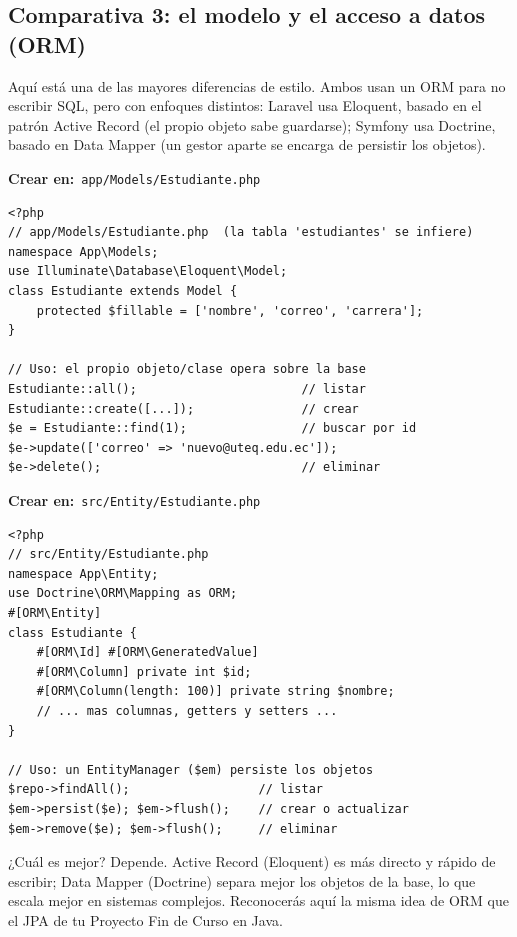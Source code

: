 \documentclass[11pt]{article}
\begin{document}
\subsection{Comparativa 3: el modelo y el acceso a datos (ORM)}
Aquí está una de las mayores diferencias de estilo. Ambos usan un ORM para no escribir SQL, pero con enfoques distintos: Laravel usa Eloquent, basado en el patrón Active Record (el propio objeto sabe guardarse); Symfony usa Doctrine, basado en Data Mapper (un gestor aparte se encarga de persistir los objetos).

{\small\color{phpazulo}\textbf{Crear en:}~}\texttt{app/\allowbreak{}Models/\allowbreak{}Estudiante.\allowbreak{}php}\par\nobreak\vspace{-1pt}
\begin{cajacodigo}
\begin{lstlisting}[style=php]
<?php
// app/Models/Estudiante.php  (la tabla 'estudiantes' se infiere)
namespace App\Models;
use Illuminate\Database\Eloquent\Model;
class Estudiante extends Model {
    protected $fillable = ['nombre', 'correo', 'carrera'];
}

// Uso: el propio objeto/clase opera sobre la base
Estudiante::all();                       // listar
Estudiante::create([...]);               // crear
$e = Estudiante::find(1);                // buscar por id
$e->update(['correo' => 'nuevo@uteq.edu.ec']);
$e->delete();                            // eliminar
\end{lstlisting}
\end{cajacodigo}
\vspace{2pt}
{\small\color{phpazulo}\textbf{Crear en:}~}\texttt{src/\allowbreak{}Entity/\allowbreak{}Estudiante.\allowbreak{}php}\par\nobreak\vspace{-1pt}
\begin{cajacodigo}
\begin{lstlisting}[style=php]
<?php
// src/Entity/Estudiante.php
namespace App\Entity;
use Doctrine\ORM\Mapping as ORM;
#[ORM\Entity]
class Estudiante {
    #[ORM\Id] #[ORM\GeneratedValue]
    #[ORM\Column] private int $id;
    #[ORM\Column(length: 100)] private string $nombre;
    // ... mas columnas, getters y setters ...
}

// Uso: un EntityManager ($em) persiste los objetos
$repo->findAll();                  // listar
$em->persist($e); $em->flush();    // crear o actualizar
$em->remove($e); $em->flush();     // eliminar
\end{lstlisting}
\end{cajacodigo}
\vspace{2pt}
¿Cuál es mejor? Depende. Active Record (Eloquent) es más directo y rápido de escribir; Data Mapper (Doctrine) separa mejor los objetos de la base, lo que escala mejor en sistemas complejos. Reconocerás aquí la misma idea de ORM que el JPA de tu Proyecto Fin de Curso en Java.
\end{document}

